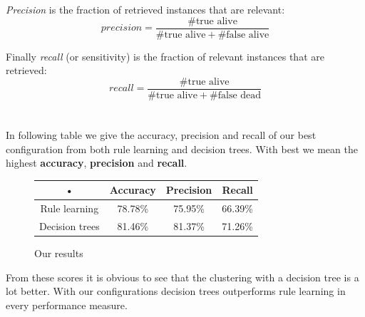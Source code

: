 \documentclass[11pt,a4paper]{article}
\begin{document}
\emph{Precision} is the fraction of retrieved instances that are relevant:
$$precision = \frac{\#\text{true alive}}{\#\text{true alive} + \#\text{false alive}}$$

Finally \emph{recall} (or sensitivity) is the fraction of relevant instances that are retrieved:
$$recall = \frac{\#\text{true alive}}{\#\text{true alive} + \#\text{false dead}}$$
\\
\\
In following table we give the accuracy, precision and recall of our best configuration from both rule learning and decision trees. With best we mean the highest \textbf{accuracy}, \textbf{precision} and \textbf{recall}.
\begin{figure}[H]
\centering
\begin{tabular}{c|c|c|c}

• & Accuracy & Precision & Recall \\ 
\hline 
Rule learning & 78.78\% & 75.95\% & 66.39\% \\ 
\hline 
Decision trees & 81.46\% & 81.37\% & 71.26\% \\ 

\end{tabular} 
\caption{Our results}
\end{figure}
From these scores it is obvious to see that the clustering with a decision tree is a lot better. With our configurations decision trees outperforms rule learning in every performance measure.
\end{document}
